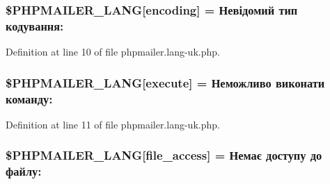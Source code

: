 \subsubsection[{\texorpdfstring{\$\+P\+H\+P\+M\+A\+I\+L\+E\+R\+\_\+\+L\+A\+NG}{$PHPMAILER_LANG}}]{\setlength{\rightskip}{0pt plus 5cm}\$P\+H\+P\+M\+A\+I\+L\+E\+R\+\_\+\+L\+A\+NG\mbox{[}\textquotesingle{}encoding\textquotesingle{}\mbox{]} = \textquotesingle{}Невідомий тип кодування\+: \textquotesingle{}}\hypertarget{phpmailer_8lang-uk_8php_a817f7283f3d54c970a0c10305cc668cc}{}\label{phpmailer_8lang-uk_8php_a817f7283f3d54c970a0c10305cc668cc}


Definition at line 10 of file phpmailer.\+lang-\/uk.\+php.

\subsubsection[{\texorpdfstring{\$\+P\+H\+P\+M\+A\+I\+L\+E\+R\+\_\+\+L\+A\+NG}{$PHPMAILER_LANG}}]{\setlength{\rightskip}{0pt plus 5cm}\$P\+H\+P\+M\+A\+I\+L\+E\+R\+\_\+\+L\+A\+NG\mbox{[}\textquotesingle{}execute\textquotesingle{}\mbox{]} = \textquotesingle{}Неможливо виконати команду\+: \textquotesingle{}}\hypertarget{phpmailer_8lang-uk_8php_a668217a9563a168f30f2a8548b6ed5a9}{}\label{phpmailer_8lang-uk_8php_a668217a9563a168f30f2a8548b6ed5a9}


Definition at line 11 of file phpmailer.\+lang-\/uk.\+php.

\subsubsection[{\texorpdfstring{\$\+P\+H\+P\+M\+A\+I\+L\+E\+R\+\_\+\+L\+A\+NG}{$PHPMAILER_LANG}}]{\setlength{\rightskip}{0pt plus 5cm}\$P\+H\+P\+M\+A\+I\+L\+E\+R\+\_\+\+L\+A\+NG\mbox{[}\textquotesingle{}file\+\_\+access\textquotesingle{}\mbox{]} = \textquotesingle{}Немає доступу до файлу\+: \textquotesingle{}}\hypertarget{phpmailer_8lang-uk_8php_a7e83349023b856ef9e5c46e30ae6d51e}{}\label{phpmailer_8lang-uk_8php_a7e83349023b856ef9e5c46e30ae6d51e}


